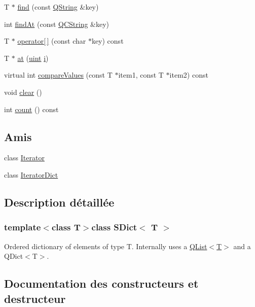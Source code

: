 \begin{DoxyCompactItemize}
\item 
T $\ast$ \hyperlink{class_s_dict_abc60b1cc06b0643753906387b7cccfe2}{find} (const \hyperlink{class_q_string}{Q\+String} \&key)
\item 
int \hyperlink{class_s_dict_a6a05b33d4c87325d4f2826921910c89d}{find\+At} (const \hyperlink{class_q_c_string}{Q\+C\+String} \&key)
\item 
T $\ast$ \hyperlink{class_s_dict_a1858d5cdf864c4fa6476137ace8bb7f5}{operator\mbox{[}$\,$\mbox{]}} (const char $\ast$key) const 
\item 
T $\ast$ \hyperlink{class_s_dict_ab993899004fc3cfc8f00f131e0b6a29d}{at} (\hyperlink{qglobal_8h_a4d3943ddea65db7163a58e6c7e8df95a}{uint} \hyperlink{060__command__switch_8tcl_a8c90afd4641b25be86bd09983c3cbee0}{i})
\item 
virtual int \hyperlink{class_s_dict_a16f7ce1ebf00329322155987bfe22861}{compare\+Values} (const T $\ast$item1, const T $\ast$item2) const 
\item 
void \hyperlink{class_s_dict_afd6bec6aaf77e2943f42cec1208bc46d}{clear} ()
\item 
int \hyperlink{class_s_dict_a9e95eebac3e87938cc5bc1f79d078c8a}{count} () const 
\end{DoxyCompactItemize}
\subsection*{Amis}
\begin{DoxyCompactItemize}
\item 
class \hyperlink{class_s_dict_a9830fc407400559db7e7783cc10a9394}{Iterator}
\item 
class \hyperlink{class_s_dict_ab362b5ead75b40c212098db068d50ac7}{Iterator\+Dict}
\end{DoxyCompactItemize}


\subsection{Description détaillée}
\subsubsection*{template$<$class T$>$class S\+Dict$<$ T $>$}

Ordered dictionary of elements of type T. Internally uses a \hyperlink{class_q_list}{Q\+List$<$\+T$>$} and a Q\+Dict$<$\+T$>$. 

\subsection{Documentation des constructeurs et destructeur}
\hypertarget{class_s_dict_a302a5a7c25fce8e9e93f7dede81ad503}{}
